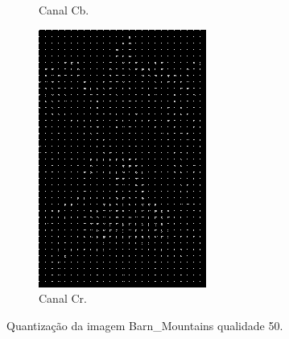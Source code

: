 \documentclass[a4paper, 12pt]{article}
\begin{document}
\begin{figure}[H]
\begin{subfigure}{0.3\textwidth}
                \caption{ Canal Cb.}
            \end{subfigure}
            \hfill
            \begin{subfigure}{0.3\textwidth}
                \centering
                \includegraphics[scale=0.5]{resources/Quantization/CRQuantization50.png} 
                \caption{ Canal Cr.}
            \end{subfigure}
            \caption{\label{fig:my_label} Quantização da imagem Barn\_Mountains qualidade 50.}
        \end{figure}
            
        \vspace{0.5cm}
        
\end{document}
